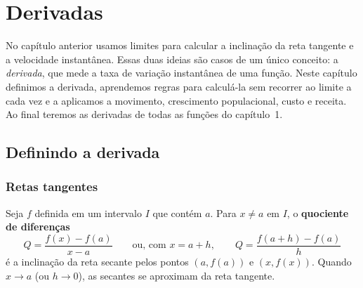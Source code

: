 \chapter{Derivadas}

No capítulo anterior usamos limites para calcular a inclinação da reta tangente e a
velocidade instantânea. Essas duas ideias são casos de um único conceito: a
\emph{derivada}, que mede a taxa de variação instantânea de uma função. Neste capítulo
definimos a derivada, aprendemos regras para calculá-la sem recorrer ao limite a cada vez e
a aplicamos a movimento, crescimento populacional, custo e receita. Ao final teremos as
derivadas de todas as funções do capítulo~1.

\section{Definindo a derivada}

\subsection{Retas tangentes}

Seja $f$ definida em um intervalo $I$ que contém $a$. Para $x\neq a$ em $I$, o
\textbf{quociente de diferenças}
\[
Q=\frac{f(x)-f(a)}{x-a}
\qquad\text{ou, com } x=a+h,\qquad
Q=\frac{f(a+h)-f(a)}{h}
\]
é a inclinação da reta secante pelos pontos $(a,f(a))$ e $(x,f(x))$. Quando $x\to a$
(ou $h\to0$), as secantes se aproximam da reta tangente.


